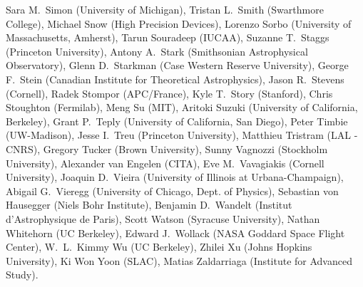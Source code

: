 Sara M.~Simon (University of Michigan),
Tristan L.~Smith (Swarthmore College),
Michael Snow (High Precision Devices),
Lorenzo Sorbo (University of Massachusetts, Amherst),
Tarun Souradeep (IUCAA),
Suzanne T.~Staggs (Princeton University),
Antony A.~Stark (Smithsonian Astrophysical Observatory),
Glenn D.~Starkman (Case Western Reserve University),
George F.~Stein (Canadian Institute for Theoretical Astrophysics),
Jason R.~Stevens (Cornell),
Radek Stompor (APC/France),
Kyle T.~Story (Stanford),
Chris Stoughton (Fermilab),
Meng Su (MIT),
Aritoki Suzuki (University of California, Berkeley),
Grant P.~Teply (University of California, San Diego),
Peter Timbie (UW-Madison),
Jesse I.~Treu (Princeton University),
Matthieu Tristram (LAL - CNRS),
Gregory Tucker (Brown University),
Sunny Vagnozzi (Stockholm University),
Alexander van Engelen (CITA),
Eve M.~Vavagiakis (Cornell University),
Joaquin D.~Vieira (University of Illinois at Urbana-Champaign),
Abigail G.~Vieregg (University of Chicago, Dept. of Physics),
Sebastian von Hausegger (Niels Bohr Institute),
Benjamin D.~Wandelt (Institut d'Astrophysique de Paris),
Scott Watson (Syracuse University),
Nathan Whitehorn (UC Berkeley),
Edward J.~Wollack (NASA Goddard Space Flight Center),
W.~L.~Kimmy Wu (UC Berkeley),
Zhilei Xu (Johns Hopkins University),
Ki Won Yoon (SLAC),
Matias Zaldarriaga (Institute for Advanced Study).
